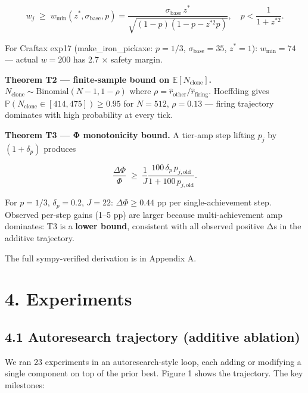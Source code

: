 \[
w_j \;\ge\; w_{\min}(z^*, \sigma_{\text{base}}, p)
= \frac{\sigma_{\text{base}} \, z^*}{\sqrt{(1-p)(1 - p - z^{*2} p)}},
\quad p < \frac{1}{1 + z^{*2}}.
\]

For Craftax exp17 (make\_iron\_pickaxe: $p = 1/3$, $\sigma_{\text{base}} = 35$,
$z^* = 1$): $w_{\min} = 74$ — actual $w = 200$ has 2.7 × safety margin.

\textbf{Theorem T2 — finite-sample bound on $\mathbb{E}[N_{\text{clone}}]$.}
$N_{\text{clone}} \sim \mathrm{Binomial}(N-1, 1-\rho)$ where
$\rho = \widehat{r}_{\text{other}}/\widehat{r}_{\text{firing}}$.
Hoeffding gives $\mathbb{P}(N_{\text{clone}} \in [414, 475]) \ge 0.95$
for $N = 512$, $\rho = 0.13$ — firing trajectory dominates with
high probability at every tick.

\textbf{Theorem T3 — Φ monotonicity bound.} A tier-amp step lifting $p_j$ by
$(1 + \delta_p)$ produces

\[
\frac{\Delta \Phi}{\Phi} \;\ge\; \frac{1}{J}
\frac{100 \, \delta_p \, p_{j,\text{old}}}{1 + 100 \, p_{j,\text{old}}}.
\]

For $p = 1/3$, $\delta_p = 0.2$, $J = 22$: $\Delta\Phi \ge 0.44$ pp per
single-achievement step. Observed per-step gains (1–5 pp) are larger
because multi-achievement amp dominates: T3 is a \textbf{lower bound},
consistent with all observed positive Δs in the additive trajectory.

The full sympy-verified derivation is in Appendix A.

\hrulefill

\section{4. Experiments}

\subsection{4.1 Autoresearch trajectory (additive ablation)}

We ran 23 experiments in an autoresearch-style loop, each adding or
modifying a single component on top of the prior best. Figure 1 shows
the trajectory. The key milestones:

